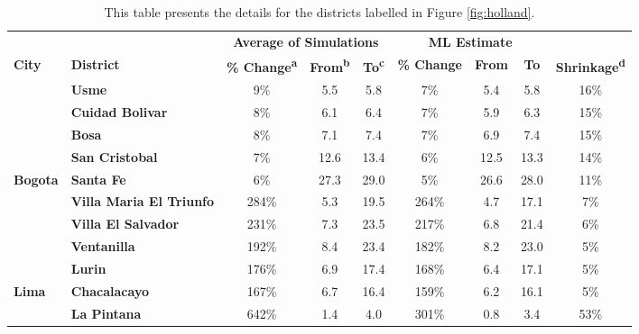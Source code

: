 \begin{table}[!h]

\caption{\label{tab:}\label{tab:top-5}This table presents the details for the districts labelled in Figure \ref{fig:holland}.}
\centering
\fontsize{8}{10}\selectfont
\begin{tabular}[t]{>{}l>{}lccccccc}
\toprule
\multicolumn{2}{c}{\textbf{ }} & \multicolumn{3}{c}{\textbf{Average of Simulations}} & \multicolumn{3}{c}{\textbf{ML Estimate}} & \multicolumn{1}{c}{\textbf{ }} \\
\cmidrule(l{3pt}r{3pt}){3-5} \cmidrule(l{3pt}r{3pt}){6-8}
\textbf{City} & \textbf{District} & \textbf{\% Change\textsuperscript{a}} & \textbf{From\textsuperscript{b}} & \textbf{To\textsuperscript{c}} & \textbf{\% Change} & \textbf{From} & \textbf{To} & \textbf{Shrinkage\textsuperscript{d}}\\
\midrule
 & \textbf{Usme} & 9\% & 5.5 & 5.8 & 7\% & 5.4 & 5.8 & 16\%\\

 & \textbf{Cuidad Bolivar} & 8\% & 6.1 & 6.4 & 7\% & 5.9 & 6.3 & 15\%\\

 & \textbf{Bosa} & 8\% & 7.1 & 7.4 & 7\% & 6.9 & 7.4 & 15\%\\

 & \textbf{San Cristobal} & 7\% & 12.6 & 13.4 & 6\% & 12.5 & 13.3 & 14\%\\

\multirow{-5}{*}{\raggedright\arraybackslash \textbf{Bogota}} & \textbf{Santa Fe} & 6\% & 27.3 & 29.0 & 5\% & 26.6 & 28.0 & 11\%\\
\cmidrule{1-9}
 & \textbf{Villa Maria El Triunfo} & 284\% & 5.3 & 19.5 & 264\% & 4.7 & 17.1 & 7\%\\

 & \textbf{Villa El Salvador} & 231\% & 7.3 & 23.5 & 217\% & 6.8 & 21.4 & 6\%\\

 & \textbf{Ventanilla} & 192\% & 8.4 & 23.4 & 182\% & 8.2 & 23.0 & 5\%\\

 & \textbf{Lurin} & 176\% & 6.9 & 17.4 & 168\% & 6.4 & 17.1 & 5\%\\

\multirow{-5}{*}{\raggedright\arraybackslash \textbf{Lima}} & \textbf{Chacalacayo} & 167\% & 6.7 & 16.4 & 159\% & 6.2 & 16.1 & 5\%\\
\cmidrule{1-9}
 & \textbf{La Pintana} & 642\% & 1.4 & 4.0 & 301\% & 0.8 & 3.4 & 53\%\\


\end{tabular}
\end{table}

